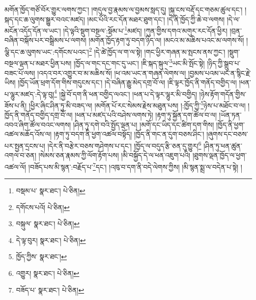 མགོན་ཁྱོད་གཙོ་བོར་གྱུར་ལགས་ཀྱང་། །གདུལ་བྱ་རྣམས་ལ་བྱམས་སླད་དུ། །སྐུ་ངས་བརྡོ་དང་གཅམ་ཚུལ་དང་། །སྐད་དང་ཆ་ལུགས་སྒྱུར་བའང་མཛད། །མང་པོའི་རང་དོན་མཐར་ཐུག་དང་། །དེ་ནི་ཁྱོད་ཀྱི་ཆེ་བ་ལགས། །དེ་ལ་མངོན་འདོད་དོན་ལ་ཡང་། །དེ་ལྟའི་སྡུག་བསྔལ་:སྡོམ་པ་\footnote{བསྡམ་པ་  སྣར་ཐང་།  པེ་ཅིན། }མཛད། །ཀུན་གྱིས་དགའ་མགུར་རང་དོན་ཕྱིར། །བྲན་བཞིན་བསྐོས་པར་བསྒྲིམས་པ་ལགས། །མགོན་ཁྱོད་རྟག་ཏུ་བདག་ཉིད་ལ། །མངའ་མ་མཆིས་པའང་མ་ལགས་སོ། །ལྕི་དང་ཆ་ལུགས་ཡང་:དགོངས་པའང་།\footnote{དགོངས་པའོ།  པེ་ཅིན། } །དེ་ཚེ་ཁྱོད་ལ་ག་ལ་སྟེ། །གང་ཕྱིར་གཞན་མ་སྤངས་ནས་ཀྱང་། །སྡུག་བསྔལ་ལྡན་པ་མཐར་ཕྱིན་པས། །ཁྱོད་ལ་གང་དང་གང་དུ་ཡང་། །ཇི་སྐད་སྐུལ་\footnote{བསྐུལ་  སྣར་ཐང་།  པེ་ཅིན། }ཡང་མི་སྤོང་སྟེ། །ཉིད་ཀྱི་སྒྲུབ་པ་བཟང་པོ་ལས། །འདའ་བར་འགྱུར་བ་མ་མཆིས་སོ། །ཕ་འམ་ཡང་ན་གཞན་ལེགས་ལ། །བྱམས་པའམ་ཡང་ན་སྙིང་རྗེ་ཡིས། །ཁྱོད་ཡོན་ཕྲག་དོག་གིས་གདུངས་དང་། །དེ་བཞིན་རྒྱུ་མེད་དགྲ་བོ་ལ། །ཇི་ལྟར་ཁྱོད་ནི་གནོད་བགྱིད་ལ། །ཕན་པ་ལྷུར་མཛད་:དེ་ལྟ་བུ།\footnote{དེ་ལྟ་བུར།  སྣར་ཐང་།  པེ་ཅིན། } །སྐྱེ་བོ་དག་ནི་ཕན་བགྱིད་ལའང་། །ཕན་པ་དེ་ལྟར་ལྷུར་མི་བགྱིད། །ཉེས་རྟོག་གདོན་གྱིས་ཟོས་པ་ནི། །ཕྱིར་ཞིང་ཤིན་ཏུ་མི་བཟད་ལ། །མགོན་པོ་རང་སེམས་རྗེས་མཐུན་པས། །:ཁྱོད་ཀྱི་\footnote{ཁྱོད་ཀྱིས་  སྣར་ཐང་། }ཉེས་པ་མཐོང་བ་ལ། །ཁྱོད་ནི་གནོད་བགྱིད་དགྲ་བོ་ལ། །ཕན་པ་མཛད་པའི་བཤེས་ལགས་ཏེ། །རྟག་ཏུ་སྐྱོན་དག་ཚོལ་བ་ལ། །ཡོན་ཏན་འབའ་ཞིག་ཚོལ་བའང་ལགས། །ཤིན་ཏུ་དགེ་བའི་སྤྱོད་ལྡན་པ། །མགོ་དང་ཡིད་དང་ཚིག་དག་གིས། །ཁྱོད་ནི་ཕྱག་འཚལ་མཆོད་འོས་ལ། །རྟག་ཏུ་བདག་ནི་ཕྱག་འཚལ་བསྟོད། །ཁྱོད་ནི་གང་ན་དུག་བཅས་ཤིང་། །ཞུགས་དང་བཅས་པར་སྤྱན་དྲངས་པ། །དེར་ནི་བརྩེར་བཅས་གཤེགས་པ་དང་། །ཁྱོད་ལ་བདུད་རྩི་ཅན་དུ་གྱུར།\footnote{འགྱུར།  སྣར་ཐང་།  པེ་ཅིན། } །ཤིན་ཏུ་ཕན་ཚུན་འགལ་བ་ཅན། །སེམས་ཅན་རྣམས་ཀྱི་ལོག་རྟོག་པས། །མི་བསྐྱོད་དེ་ལ་ཕན་འཇུག་པའི། །ཐུགས་ལྡན་ཁྱོད་ལ་ཕྱག་འཚལ་ལོ། །བཟོད་པས་མི་སྙན་:བརྗོད་པ་\footnote{བཟོད་པ་  སྣར་ཐང་།  པེ་ཅིན། }དང་། །འཁུ་བ་དག་ནི་བདེ་ལེགས་ཀྱིས། །མི་སྙན་སྨྲ་ལ་བདེན་པ་སྟེ། །
